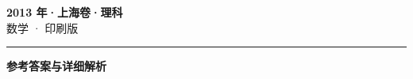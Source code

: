 \documentclass[zihao=5, a4paper]{ctexart}
\begin{document}
\begin{center}
  {\Large\bfseries 2013 年·上海卷·理科}\\[4pt]
  {\large 数学 · 印刷版}
\end{center}
\medskip
{}

\par\bigskip\hrule\bigskip
{}
\Needspace{0.55\textheight}
\begin{center}{\large\bfseries 参考答案与详细解析}\end{center}
\smallskip

\end{document}

